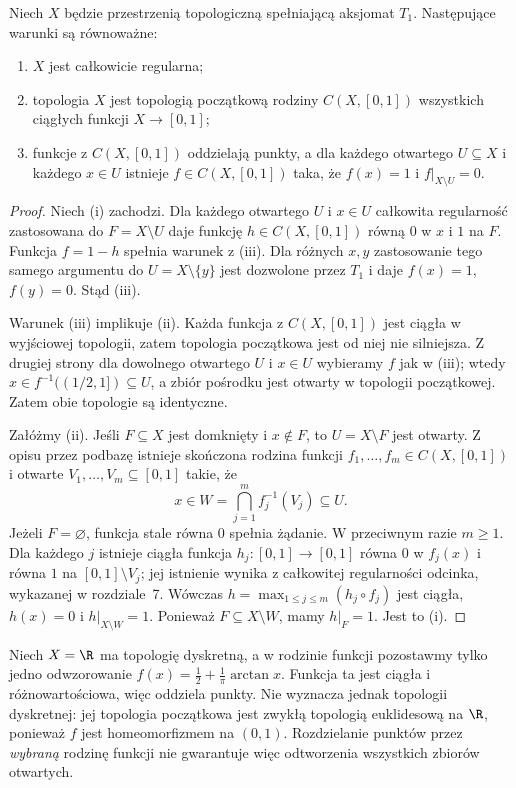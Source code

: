 \begin{twierdzenie}
\label{thm:topog-uzwarcenia-funkcyjny-opis}
Niech $X$ będzie przestrzenią topologiczną
spełniającą aksjomat $T_1$. Następujące
warunki są równoważne:
\begin{enumerate}[label=(\roman*)]
\item $X$ jest całkowicie regularna;
\item topologia $X$ jest topologią początkową
rodziny $C(X,[0,1])$ wszystkich ciągłych
funkcji $X\to[0,1]$;
\item funkcje z $C(X,[0,1])$ oddzielają punkty,
a dla każdego otwartego $U\subseteq X$
i każdego $x\in U$ istnieje $f\in C(X,[0,1])$
taka, że $f(x)=1$ i $f|_{X\setminus U}=0$.
\end{enumerate}
\end{twierdzenie}
\begin{proof}
Niech (i) zachodzi. Dla każdego
otwartego $U$ i $x\in U$ całkowita
regularność zastosowana do
$F=X\setminus U$ daje funkcję
$h\in C(X,[0,1])$ równą $0$ w $x$
i $1$ na $F$. Funkcja $f=1-h$
spełnia warunek z (iii).
Dla różnych $x,y$ zastosowanie tego
samego argumentu do $U=X\setminus\{y\}$
jest dozwolone przez $T_1$
i daje $f(x)=1$, $f(y)=0$.
Stąd (iii).

Warunek (iii) implikuje (ii).
Każda funkcja z $C(X,[0,1])$
jest ciągła w wyjściowej topologii,
zatem topologia początkowa jest
od niej nie silniejsza. Z drugiej strony
dla dowolnego otwartego $U$ i $x\in U$
wybieramy $f$ jak w (iii); wtedy
$x\in f^{-1}((1/2,1])\subseteq U$,
a zbiór pośrodku jest otwarty
w topologii początkowej.
Zatem obie topologie są identyczne.

Załóżmy (ii). Jeśli $F\subseteq X$
jest domknięty i $x\notin F$,
to $U=X\setminus F$ jest otwarty.
Z opisu przez podbazę istnieje
skończona rodzina funkcji
$f_1,\ldots,f_m\in C(X,[0,1])$
i otwarte $V_1,\ldots,V_m\subseteq[0,1]$
takie, że
\[
x\in W=\bigcap_{j=1}^{m}f_j^{-1}(V_j)
\subseteq U.
\]
Jeżeli $F=\varnothing$, funkcja stale
równa $0$ spełnia żądanie. W przeciwnym
razie $m\ge1$. Dla każdego $j$
istnieje ciągła funkcja
$h_j\colon[0,1]\to[0,1]$
równa $0$ w $f_j(x)$ i równa $1$
na $[0,1]\setminus V_j$;
jej istnienie wynika z całkowitej
regularności odcinka, wykazanej
w rozdziale~7.
Wówczas
$h=\max_{1\le j\le m}(h_j\circ f_j)$
jest ciągła, $h(x)=0$ i
$h|_{X\setminus W}=1$.
Ponieważ $F\subseteq X\setminus W$,
mamy $h|_F=1$. Jest to (i).
\end{proof}

\begin{przyklad}
\label{ex:topog-uzwarcenia-samo-oddzielanie}
Niech $X=\R$ ma topologię dyskretną,
a w rodzinie funkcji pozostawmy
tylko jedno odwzorowanie
$f(x)=\frac12+\frac1\pi\arctan x$.
Funkcja ta jest ciągła i różnowartościowa,
więc oddziela punkty. Nie wyznacza jednak
topologii dyskretnej: jej topologia
początkowa jest zwykłą topologią
euklidesową na $\R$, ponieważ $f$
jest homeomorfizmem na $(0,1)$.
Rozdzielanie punktów przez
\emph{wybraną} rodzinę funkcji
nie gwarantuje więc odtworzenia
wszystkich zbiorów otwartych.
\end{przyklad}

